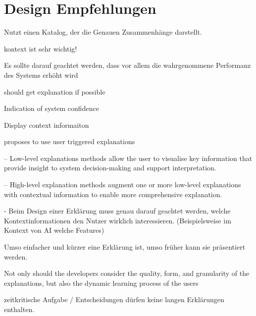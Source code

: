\section{Design Empfehlungen}
\label{sec:model_design_implications}

\cite{carvalho2020developers} Nutzt einen Katalog, der die Genauen Zusammenhänge darstellt.

kontext ist sehr wichtig! \cite{sato_context_nodate}

Es sollte darauf geachtet werden, dass vor allem die wahrgenommene Performanz des Systems erhöht wird \cite{riveiro_thats_2021}

should get explanation if possible \cite{wiegand_id_2020}

Indication of system confidence \cite{wiegand_id_2020, golledge1999wayfinding}

Display context informaiton \cite{wiegand_id_2020}

\cite{weitz_you_2019} proposes to use user triggered explanations

– Low-level explanations methods allow the user to visualise key information that provide insight to system decision-making and support interpretation. \cite{martin_evaluating_2021}

– High-level explanation methods augment one or more low-level explanations with contextual information to enable more comprehensive explanation. \cite{martin_evaluating_2021}

- Beim Design einer Erklärung muss genau darauf geachtet werden, welche Kontextinformationen den Nutzer wirklich interessieren. (Beispielsweise im Kontext von AI welche Features) \cite{rjoob_towards_2021}

Umso einfacher und kürzer eine Erklärung ist, umso früher kann sie präsentiert werden. \cite{hleg2019policy, sovrano_modelling_2020}

\glqq Not only should the developers consider the quality, form, and granularity of the explanations, but also the dynamic learning process of the users \grqq{} \cite{wang_integration_2020}

\cite{wiegand_id_2020, wiegand2019drive} zeitkritische Aufgabe / Entscheidungen dürfen keine langen Erklärungen enthalten.